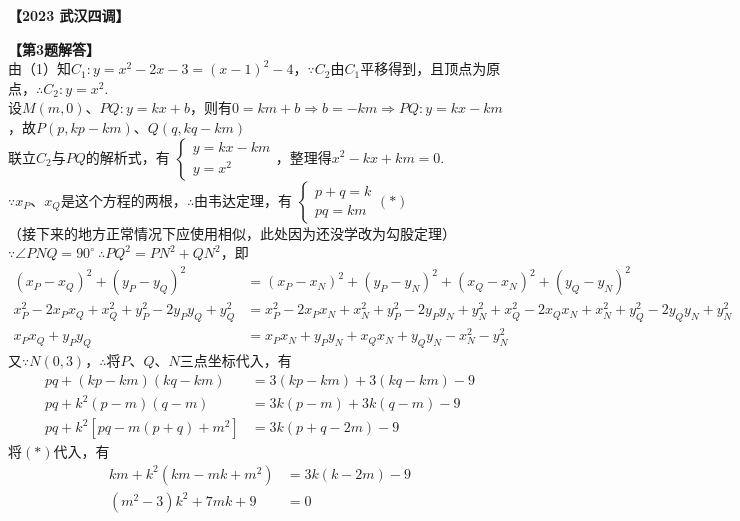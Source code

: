 \documentclass[10pt]{article}
\begin{document}
\textbf{【2023 武汉四调】}
\begin{figure}[!htb]
    \centering
\end{figure}\par

\begin{questions}{}
    \question \textbf{【第3题解答】} \\
    由（1）知$C_1:y=x^2-2x-3=(x-1)^2-4$，$\because C_2$由$C_1$平移得到，且顶点为原点，$\therefore C_2:y=x^2$.\\
    设$M(m,0)$、$PQ:y=kx+b$，则有$0=km+b \Rightarrow b=-km \Rightarrow PQ:y=kx-km$，故$P(p,kp-km)$、$Q(q,kq-km)$ \\
    联立$C_2$与$PQ$的解析式，有
    $\begin{cases}
        y=kx-km \\
        y=x^2
    \end{cases}$，整理得$x^2-kx+km=0$.\\
    $\because x_P$、$x_Q$是这个方程的两根，$\therefore$由韦达定理，有
    $\begin{cases}
        p+q=k \\
        pq=km
    \end{cases} (*)$\\
    （接下来的地方正常情况下应使用相似，此处因为还没学改为勾股定理）\\
    $\because \angle PNQ=90^{\circ} \ \therefore PQ^2=PN^2+QN^2$，即
    $$\begin{aligned}
        (x_P-x_Q)^2+(y_P-y_Q)^2 &= (x_P-x_N)^2+(y_P-y_N)^2+(x_Q-x_N)^2+(y_Q-y_N)^2 \\
        x_P^2-2x_Px_Q+x_Q^2+y_P^2-2y_Py_Q+y_Q^2 &= x_P^2-2x_Px_N+x_N^2+y_P^2-2y_Py_N+y_N^2+x_Q^2-2x_Qx_N+x_N^2+y_Q^2-2y_Qy_N+y_N^2 \\
        x_Px_Q+y_Py_Q &= x_Px_N+y_Py_N+x_Qx_N+y_Qy_N-x_N^2-y_N^2
    \end{aligned}$$
    又$\because N(0,3)$，$\therefore$将$P$、$Q$、$N$三点坐标代入，有
    $$\begin{aligned}
        pq+(kp-km)(kq-km) &= 3(kp-km)+3(kq-km)-9 \\
        pq+k^2(p-m)(q-m) &= 3k(p-m)+3k(q-m)-9 \\
        pq+k^2[pq-m(p+q)+m^2] &= 3k(p+q-2m)-9
    \end{aligned}$$
    将$(*)$代入，有
    $$\begin{aligned}
        km+k^2(km-mk+m^2) &= 3k(k-2m)-9 \\
        (m^2-3)k^2+7mk+9 &= 0
    \end{aligned}$$

\end{questions}
\end{document}
